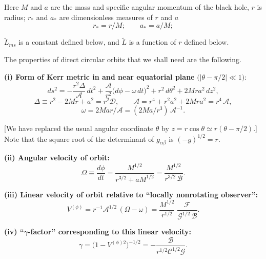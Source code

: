 Here $M$ and $a$ are the mass and specific angular momentum of the black hole, $r$ is
radius; $r_*$ and $a_*$ are dimensionless measures of $r$ and $a$
\begin{equation}
r_* = r/M;\qquad a_* = a/M;
\end{equation}

$\tilde{L}_{ms}$ is a constant defined below, and $\tilde{L}$ is a function of $r$ defined below.

The properties of direct circular orbits that we shall need are the following.

\medskip
\noindent
\textbf{(i) Form of Kerr metric in and near equatorial plane}
$\bigl(|\theta - \pi/2| \ll 1\bigr)$:
%
\begin{equation}
ds^2 = -\frac{r^2\Delta}{\mathscr{A}}\,dt^2 + \frac{\mathscr{A}}{r^2}
\bigl(d\phi - \omega\,dt\bigr)^2 + r^2\,d\theta^2 + 2Mra^2\,dz^2 ,
\tag{5.4.2a}
\end{equation}
%
\begin{equation}
\Delta \equiv r^2 - 2Mr + a^2 = r^2\mathscr{D},\qquad
\mathscr{A} = r^4 + r^2a^2 + 2Mra^2 = r^4\,\mathscr{A},
\tag{5.4.2b}
\end{equation}
%
\begin{equation}
\omega = 2Mar/\mathscr{A} = (2Ma/r^3)\,\mathscr{A}^{-1}.
\tag{5.4.2b}
\end{equation}

[We have replaced the usual angular coordinate $\theta$ by
$z = r\cos\theta \simeq r(\theta - \pi/2)$.]
Note that the square root of the determinant of $g_{\alpha\beta}$ is
$(-g)^{1/2} = r$.

\medskip
\noindent
\textbf{(ii) Angular velocity of orbit:}
%
\begin{equation}
\Omega \equiv \frac{d\phi}{dt} = \frac{M^{1/2}}{r^{3/2} + aM^{1/2}}
= \frac{M^{1/2}}{r^{3/2}\,\mathscr{B}}.
\tag{5.4.3}
\end{equation}

\medskip
\noindent
\textbf{(iii) Linear velocity of orbit relative to ``locally nonrotating observer'':}
%
\begin{equation}
V^{(\phi)} = r^{-1}\mathscr{A}^{1/2}\,(\Omega - \omega)
= \frac{M^{1/2}}{r^{1/2}}\;\frac{\mathscr{F}}
{\mathscr{G}^{1/2}\,\mathscr{B}}.
\tag{5.4.4}
\end{equation}

\medskip
\noindent
\textbf{(iv) ``$\gamma$-factor'' corresponding to this linear velocity:}
%
\begin{equation}
\gamma = \bigl(1 - V^{(\phi)2}\bigr)^{-1/2}
= -\frac{\mathscr{B}}{r^{1/2}\mathscr{C}^{1/2}\mathscr{G}}.
\tag{5.4.4b}
\end{equation}

